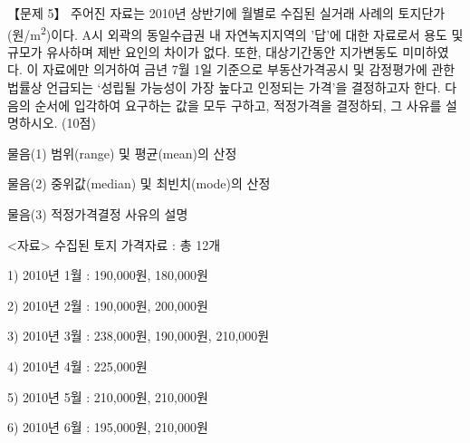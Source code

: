 \begin{longquestion}{【문제 5】}
주어진 자료는 2010년 상반기에 월별로 수집된 실거래 사례의 토지단가(원/m\textsuperscript{2})이다. A시 외곽의 동일수급권 내 자연녹지지역의 '답'에 대한 자료로서 용도 및 규모가 유사하며 제반 요인의 차이가 없다. 또한, 대상기간동안 지가변동도 미미하였다. 이 자료에만 의거하여 금년 7월 1일 기준으로 부동산가격공시 및 감정평가에 관한 법률상 언급되는 ‘성립될 가능성이 가장 높다고 인정되는 가격’을 결정하고자 한다. 다음의 순서에 입각하여 요구하는 값을 모두 구하고, 적정가격을 결정하되, 그 사유를 설명하시오. (10점) \par
물음(1) 범위(range) 및 평균(mean)의 산정 \par
물음(2) 중위값(median) 및 최빈치(mode)의 산정 \par
물음(3) 적정가격결정 사유의 설명 \par
<자료> 수집된 토지 가격자료 : 총 12개 \par
1) 2010년 1월 : 190,000원, 180,000원 \par
2) 2010년 2월 : 190,000원, 200,000원 \par
3) 2010년 3월 : 238,000원, 190,000원, 210,000원 \par
4) 2010년 4월 : 225,000원 \par
5) 2010년 5월 : 210,000원, 210,000원 \par
6) 2010년 6월 : 195,000원, 210,000원 \par
\end{longquestion}
